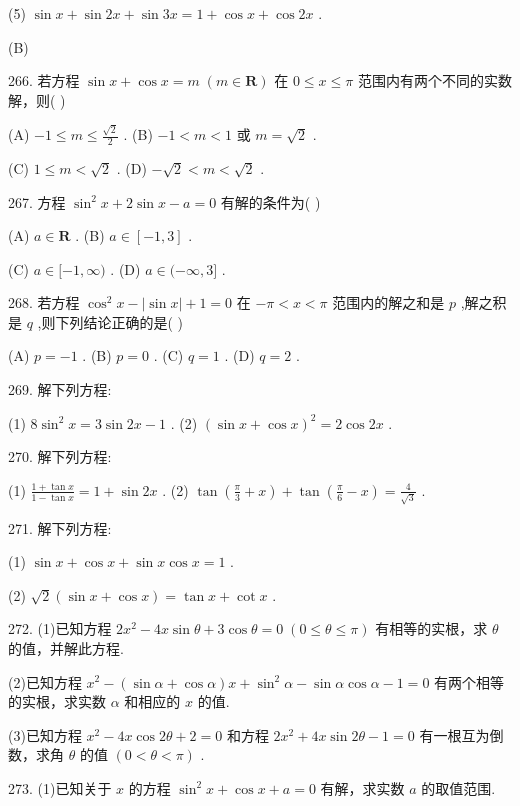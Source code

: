 \documentclass[10pt]{article}
\begin{document}
(5) \(\sin x + \sin {2x} + \sin {3x} = 1 + \cos x + \cos {2x}\) .

(B)

266. 若方程 \(\sin x + \cos x = m\;\left( {m \in  \mathbf{R}}\right)\) 在 \(0 \leq  x \leq  \pi\) 范围内有两个不同的实数解，则( )

(A) \(- 1 \leq  m \leq  \frac{\sqrt{2}}{2}\) . (B) \(- 1 < m < 1\) 或 \(m = \sqrt{2}\) .

(C) \(1 \leq  m < \sqrt{2}\) . (D) \(- \sqrt{2} < m < \sqrt{2}\) .

267. 方程 \({\sin }^{2}x + 2\sin x - a = 0\) 有解的条件为( )

(A) \(a \in  \mathbf{R}\) . (B) \(a \in  \left\lbrack  {-1,3}\right\rbrack\) .

(C) \(a \in  \lbrack  - 1,\infty )\) . (D) \(a \in  ( - \infty ,3\rbrack\) .

268. 若方程 \({\cos }^{2}x - \left| {\sin x}\right|  + 1 = 0\) 在 \(- \pi  < x < \pi\) 范围内的解之和是 \(p\) ,解之积是 \(q\) ,则下列结论正确的是( )

(A) \(p =  - 1\) . (B) \(p = 0\) . (C) \(q = 1\) . (D) \(q = 2\) .

269. 解下列方程:

(1) \(8{\sin }^{2}x = 3\sin {2x} - 1\) . (2) \({\left( \sin x + \cos x\right) }^{2} = 2\cos {2x}\) .

270. 解下列方程:

(1) \(\frac{1 + \tan x}{1 - \tan x} = 1 + \sin {2x}\) . (2) \(\tan \left( {\frac{\pi }{3} + x}\right)  + \tan \left( {\frac{\pi }{6} - x}\right)  = \frac{4}{\sqrt{3}}\) .

271. 解下列方程:

(1) \(\sin x + \cos x + \sin x\cos x = 1\) .

(2) \(\sqrt{2}\left( {\sin x + \cos x}\right)  = \tan x + \cot x\) .

272. (1)已知方程 \(2{x}^{2} - {4x}\sin \theta  + 3\cos \theta  = 0\;\left( {0 \leq  \theta  \leq  \pi }\right)\) 有相等的实根，求 \(\theta\) 的值，并解此方程.

(2)已知方程 \({x}^{2} - \left( {\sin \alpha  + \cos \alpha }\right) x + {\sin }^{2}\alpha  - \sin \alpha \cos \alpha  - 1 = 0\) 有两个相等的实根，求实数 \(\alpha\) 和相应的 \(x\) 的值.

(3)已知方程 \({x}^{2} - {4x}\cos {2\theta } + 2 = 0\) 和方程 \(2{x}^{2} + {4x}\sin {2\theta } - 1 = 0\) 有一根互为倒数，求角 \(\theta\) 的值 \(\left( {0 < \theta  < \pi }\right)\) .

273. (1)已知关于 \(x\) 的方程 \({\sin }^{2}x + \cos x + a = 0\) 有解，求实数 \(a\) 的取值范围.
\end{document}
